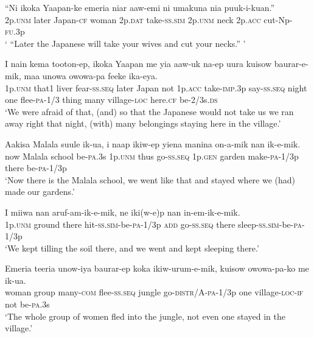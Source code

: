 \ea
\gll  “Ni  ikoka  Yaapan-ke  emeria  niar  aaw-emi   ni  umakuna  nia  puuk-i-kuan.” \\
2p.\textsc{unm}  later  Japan-\textsc{cf}  woman  2p.\textsc{dat}  take-\textsc{ss}.\textsc{sim} 2p.\textsc{unm}  neck  2p.\textsc{acc}  cut-Np-\textsc{fu}.3p \\
\glt ‘ “Later the Japanese will take your wives and cut your necks.” ’ \\
\z


\ea
\gll  I  nain  kema  tooton-ep,  ikoka  Yaapan  me  yia       aaw-uk  na-ep  uura  kuisow  baurar-e-mik, maa  unowa  owowa-pa  feeke  ika-eya. \\
1p.\textsc{unm}  that1  liver  fear-\textsc{ss.seq}  later  Japan  not  1p.\textsc{acc} take-\textsc{imp}.3p  say-\textsc{ss.seq}  night  one  flee-\textsc{pa}-1/3 thing  many  village-\textsc{loc}  here.\textsc{cf}  be-2/3s.\textsc{ds}\\
\glt ‘We were afraid of that, (and) so that the Japanese would not take us we ran away right that night, (with) many belongings staying here in the village.’ \\
\z


\ea
\gll  Aakisa  Malala  suule  ik-ua,  i  naap  ikiw-ep yiena  manina  on-a-mik  nan  ik-e-mik. \\
now  Malala  school  be-\textsc{pa}.3s  1p.\textsc{unm}  thus  go-\textsc{ss.seq} 1p.\textsc{gen}  garden  make-\textsc{pa}-1/3p  there  be-\textsc{pa}-1/3p \\
\glt ‘Now there is the Malala school, we went like that and stayed where we (had) made our gardens.’ \\
\z


\ea
\gll  I  miiwa  nan  aruf-am-ik-e-mik,  ne  iki(w-e)p  nan  in-em-ik-e-mik. \\
1p.\textsc{unm}  ground  there  hit-\textsc{ss}.\textsc{sim}-be-\textsc{pa}-1/3p  \textsc{add}  go-\textsc{ss.seq} there  sleep-\textsc{ss}.\textsc{sim}-be-\textsc{pa}-1/3p \\
\glt ‘We kept tilling the soil there, and we went and kept sleeping there.’ \\
\z


\ea
\gll  Emeria  teeria  unow-iya  baurar-ep  koka   ikiw-urum-e-mik,  kuisow  owowa-pa-ko  me  ik-ua. \\
woman  group  many-\textsc{com}  flee-\textsc{ss.seq}  jungle go-\textsc{distr}/A-\textsc{pa}-1/3p  one  village-\textsc{loc}-\textsc{if}  not  be-\textsc{pa}.3s\\
\glt ‘The whole group of women fled into the jungle, not even one stayed in the village.’ \\
\z


